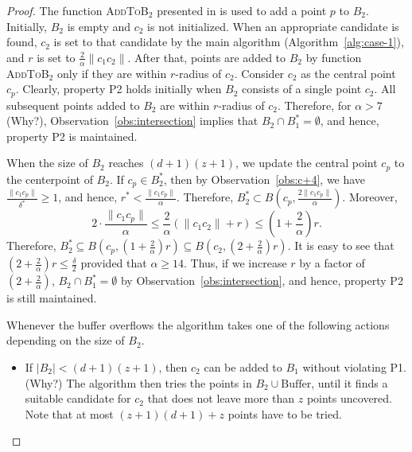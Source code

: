 \documentclass[envcountsame]{cls/cccg15}
\newcommand{\rc}{r}
\newcommand{\cp}{c_p}
\newcommand{\dz}{(d + 1)(z + 1)}
\newcommand{\textproc}{\textsc}
\newcommand{\len}[1]{\|{#1}\|}
\newcommand{\lee}{\leqslant}
\newcommand{\gee}{\geqslant}
\renewcommand{\leq}{\lee}
\renewcommand{\le}{\lee}
\renewcommand{\geq}{\gee}
\renewcommand{\ge}{\gee}
\begin{document}
\begin{proof}
The function \textproc{AddToB$_2$} presented in 
is used to add a point $p$ to $B_2$.
Initially, $B_2$ is empty and $c_2$ is not initialized. 
When an appropriate candidate is found, 
$c_2$ is set to that candidate by the main algorithm (Algorithm~\ref{alg:case-1}),
and $\rc$ is set to $\frac{2}{\alpha}\len{c_1c_2}$.
After that, points are added to $B_2$ by function \textproc{AddToB$_2$}
only if they are within $\rc$-radius of $c_2$. 
Consider $c_2$ as the central point $c_p$. %
Clearly, property P2 holds initially when $B_2$ consists of a single point $c_2$. 
All subsequent points added to $B_2$ are within $\rc$-radius of $c_2$.
Therefore, for $\alpha > 7$ (Why?), Observation~\ref{obs:intersection}
implies that $B_2 \cap B_1^* = \emptyset$,
and hence, property P2 is maintained. %


When the size of $B_2$ reaches $\dz$, 
we update the central point $\cp$ to the centerpoint of $B_2$.
If $\cp \in B_2^*$, then by Observation~\ref{obs:c+4},
we have $\frac{\len{c_1\cp}}{\delta^*} \geq 1$,
and hence, $r^* < \frac{\len{c_1\cp}}{\alpha}$. 
Therefore, $B_2^* \subset B(\cp, \frac{2\len{c_1\cp}}{\alpha})$.
Moreover,
\[
	2 \cdot \frac{\len{c_1\cp}}{\alpha} \leq \frac{2}{\alpha}(\len{c_1c_2} + \rc ) 
	\leq (1 + \frac{2}{\alpha})\rc.
\]
Therefore, $B_2^* \subseteq B(c_p, (1 + \frac{2}{\alpha})\rc )
\subseteq B(c_2, (2 + \frac{2}{\alpha})\rc )$. 
It is easy to see that $(2 + \frac{2}{\alpha})\rc  \le \frac{\delta}{2}$ provided that $\alpha \ge 14$.
Thus, if we increase $\rc$ by a factor of $(2 + \frac{2}{\alpha})$, 
$B_2 \cap B_1^* = \emptyset$
by Observation~\ref{obs:intersection}, and hence,
property P2 is still maintained. 

Whenever the buffer overflows 
the algorithm takes one of the following actions
depending on the size of $B_2$. 

\begin{itemize}
\item 
If $|B_2| < \dz$, then $c_2$ can be added to $B_1$
without violating P1. (Why?) 
The algorithm then tries the points in $B_2 \cup \mbox{Buffer}$, 
until it finds a suitable candidate for $c_2$ that does not leave
more than $z$ points uncovered. 
Note that at most $(z+1)(d+1) + z$ points have to be tried. 


\end{itemize}
\end{proof}
\end{document}
